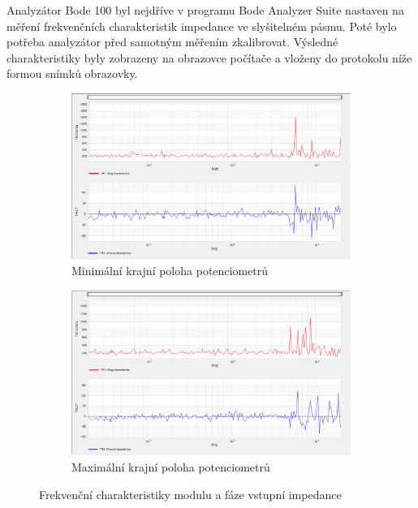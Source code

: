 \documentclass[a4paper, czech]{article}
\begin{document}
Analyzátor Bode 100 byl nejdříve v programu Bode Analyzer Suite nastaven na měření
frekvenčních charakteristik impedance ve slyšitelném pásmu.
Poté bylo potřeba analyzátor před samotným měřením zkalibrovat.
Výsledné charakteristiky byly zobrazeny na obrazovce počítače a vloženy do protokolu
níže formou snímků obrazovky.

\begin{figure}[H]
    \centering
    \begin{subfigure}{0.49\textwidth}
        \includegraphics[width=\textwidth]{nkzt9_3_min_min_min.png}
        \caption{Minimální krajní poloha potenciometrů}
    \end{subfigure}
    \hfill
    \begin{subfigure}{0.49\textwidth}
        \includegraphics[width=\textwidth]{nkzt9_3_max_max_max.png}
        \caption{Maximální krajní poloha potenciometrů}
    \end{subfigure}
    \caption{Frekvenční charakteristiky modulu a fáze vstupní impedance} 
\end{figure}
\end{document}
